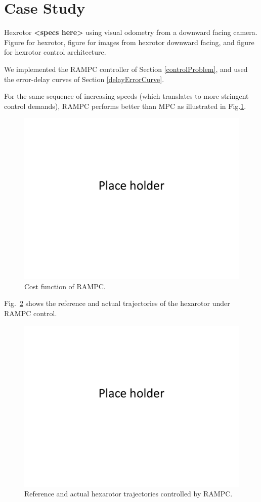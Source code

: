 \section{Case Study}
\label{experiments}

Hexrotor \textbf{<specs here>} using visual odometry from a downward facing camera. Figure for hexrotor, figure for images from hexrotor downward facing, and figure for hexrotor control architecture.  

We implemented the RAMPC controller of Section \ref{controlProblem}, and used the error-delay curves of Section \ref{delayErrorCurve}.



For the same sequence of increasing speeds (which translates to more stringent control demands), RAMPC performs better than MPC as illustrated in Fig.\ref{fig:RAMPCcost}.
\begin{figure}[t]
	\centering
	\includegraphics[width=0.7\linewidth]{figures/placeHolder}
	\caption{Cost function of RAMPC.}
	\label{fig:RAMPCcost}
\end{figure}

Fig.~\ref{fig:RAMPCtrajectory} shows the reference and actual trajectories of the hexarotor under RAMPC control.
\begin{figure}[t]
	\centering
	\includegraphics[width=0.7\linewidth]{figures/placeHolder}
	\caption{Reference and actual hexarotor trajectories controlled by RAMPC.}
	\label{fig:RAMPCtrajectory}
\end{figure}

